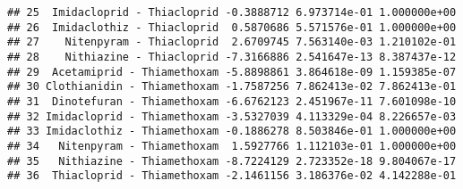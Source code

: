 \documentclass[]{article}
\begin{document}
\begin{verbatim}
## 25  Imidacloprid - Thiacloprid -0.3888712 6.973714e-01 1.000000e+00
## 26  Imidaclothiz - Thiacloprid  0.5870686 5.571576e-01 1.000000e+00
## 27    Nitenpyram - Thiacloprid  2.6709745 7.563140e-03 1.210102e-01
## 28    Nithiazine - Thiacloprid -7.3166886 2.541647e-13 8.387437e-12
## 29  Acetamiprid - Thiamethoxam -5.8898861 3.864618e-09 1.159385e-07
## 30 Clothianidin - Thiamethoxam -1.7587256 7.862413e-02 7.862413e-01
## 31  Dinotefuran - Thiamethoxam -6.6762123 2.451967e-11 7.601098e-10
## 32 Imidacloprid - Thiamethoxam -3.5327039 4.113329e-04 8.226657e-03
## 33 Imidaclothiz - Thiamethoxam -0.1886278 8.503846e-01 1.000000e+00
## 34   Nitenpyram - Thiamethoxam  1.5927766 1.112103e-01 1.000000e+00
## 35   Nithiazine - Thiamethoxam -8.7224129 2.723352e-18 9.804067e-17
## 36  Thiacloprid - Thiamethoxam -2.1461156 3.186376e-02 4.142288e-01
\end{verbatim}
\end{document}
